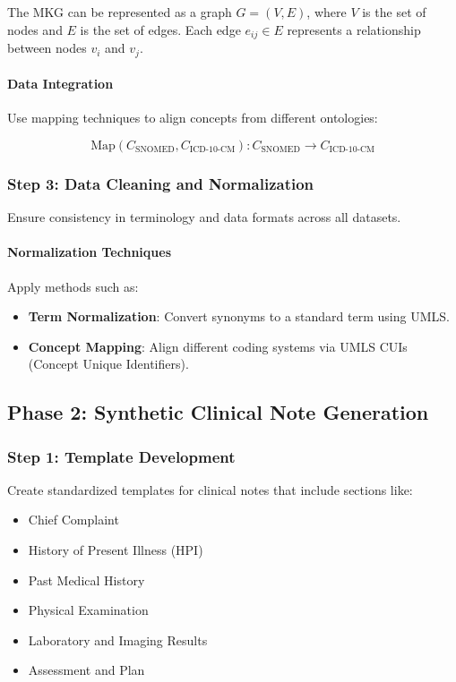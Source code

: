 \documentclass[12pt, a4paper]{article}
\begin{document}
The MKG can be represented as a graph \( G = (V, E) \), where \( V \) is the set of nodes and \( E \) is the set of edges. Each edge \( e_{ij} \in E \) represents a relationship between nodes \( v_i \) and \( v_j \).

\paragraph{Data Integration}

Use mapping techniques to align concepts from different ontologies:

\begin{equation}
\text{Map}(C_{\text{SNOMED}}, C_{\text{ICD-10-CM}}): C_{\text{SNOMED}} \rightarrow C_{\text{ICD-10-CM}}
\end{equation}

\subsubsection{Step 3: Data Cleaning and Normalization}

Ensure consistency in terminology and data formats across all datasets.

\paragraph{Normalization Techniques}

Apply methods such as:

\begin{itemize}
    \item \textbf{Term Normalization}: Convert synonyms to a standard term using UMLS.
    \item \textbf{Concept Mapping}: Align different coding systems via UMLS CUIs (Concept Unique Identifiers).
\end{itemize}

\subsection{Phase 2: Synthetic Clinical Note Generation}

\subsubsection{Step 1: Template Development}

Create standardized templates for clinical notes that include sections like:

\begin{itemize}
    \item Chief Complaint
    \item History of Present Illness (HPI)
    \item Past Medical History
    \item Physical Examination
    \item Laboratory and Imaging Results
    \item Assessment and Plan
\end{itemize}
\end{document}
